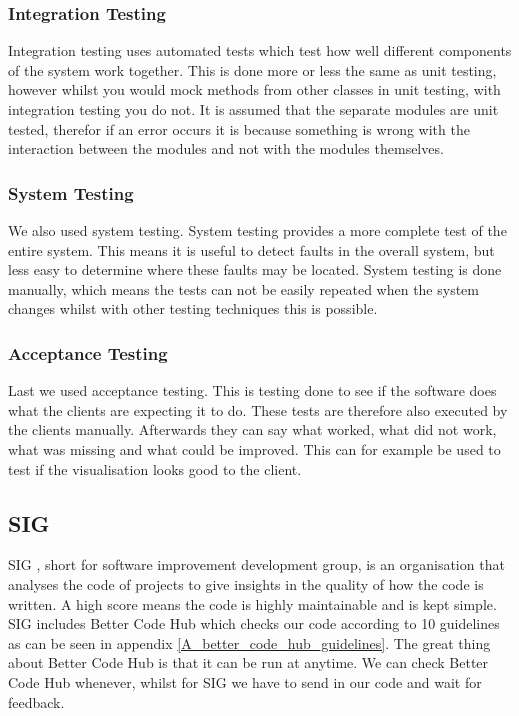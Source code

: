 \subsubsection{Integration Testing}
Integration testing uses automated tests which test how well different components of the system work together. This is done more or less the same as unit testing, however whilst you would mock methods from other classes in unit testing, with integration testing you do not. It is assumed that the separate modules are unit tested, therefor if an error occurs it is because something is wrong with the interaction between the modules and not with the modules themselves. 

\subsubsection{System Testing}
We also used system testing. System testing provides a more complete test of the entire system. This means it is useful to detect faults in the overall system, but less easy to determine where these faults may be located. System testing is done manually, which means the tests can not be easily repeated when the system changes whilst with other testing techniques this is possible.

\subsubsection{Acceptance Testing}\label{sec:acceptance-testing}
Last we used acceptance testing. This is testing done to see if the software does what the clients are expecting it to do. These tests are therefore also executed by the clients manually. Afterwards they can say what worked, what did not work, what was missing and what could be improved. This can for example be used to test if the visualisation looks good to the client.\\

\subsection{SIG}
SIG \cite{sig}, short for software improvement development group, is an organisation that analyses the code of projects to give insights in the quality of how the code is written. A high score means the code is highly maintainable and is kept simple. SIG includes Better Code Hub \cite{bch_guidelines} which checks our code according to 10 guidelines as can be seen in appendix \ref{A_better_code_hub_guidelines}. The great thing about Better Code Hub is that it can be run at anytime. We can check Better Code Hub whenever, whilst for SIG we have to send in our code and wait for feedback. 


